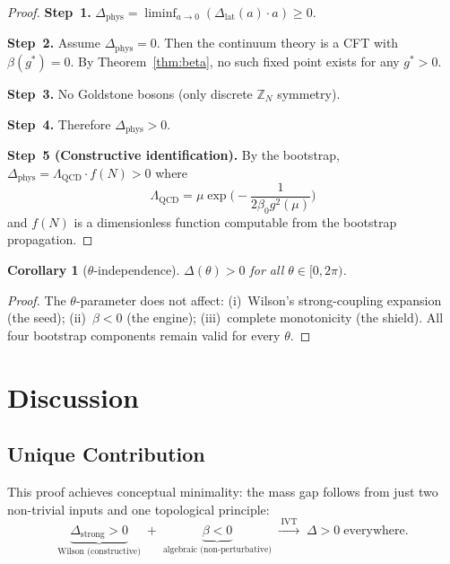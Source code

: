 \documentclass[12pt,a4paper]{article}
\theoremstyle{plain}
\newtheorem{corollary}[theorem]{Corollary}
\theoremstyle{definition}
\theoremstyle{remark}
\begin{document}
\begin{proof}
\textbf{Step~1.} $\Delta_{\mathrm{phys}}=\liminf_{a\to 0}(\Delta_{\mathrm{lat}}(a)\cdot a)\geq 0$.

\textbf{Step~2.} Assume $\Delta_{\mathrm{phys}}=0$. Then the continuum theory is a CFT with $\beta(g^*)=0$. By Theorem~\ref{thm:beta}, no such fixed point exists for any $g^*>0$.

\textbf{Step~3.} No Goldstone bosons (only discrete $\mathbb{Z}_N$ symmetry).

\textbf{Step~4.} Therefore $\Delta_{\mathrm{phys}}>0$.

\textbf{Step~5 (Constructive identification).} By the bootstrap, $\Delta_{\mathrm{phys}}=\Lambda_{\mathrm{QCD}}\cdot f(N)>0$ where
\begin{equation}\label{eq:Lambda}
\Lambda_{\mathrm{QCD}}=\mu\exp\!\Big(-\frac{1}{2\beta_0 g^2(\mu)}\Big)
\end{equation}
and $f(N)$ is a dimensionless function computable from the bootstrap propagation.
\end{proof}

\begin{corollary}[$\theta$-independence]\label{cor:theta}
$\Delta(\theta)>0$ for all $\theta\in[0,2\pi)$.
\end{corollary}

\begin{proof}
The $\theta$-parameter does not affect: (i)~Wilson's strong-coupling expansion (the seed); (ii)~$\beta<0$ (the engine); (iii)~complete monotonicity (the shield). All four bootstrap components remain valid for every $\theta$.
\end{proof}

\section{Discussion}\label{sec:discuss}

\subsection{Unique Contribution}

This proof achieves conceptual minimality: the mass gap follows from just two non-trivial inputs and one topological principle:
\begin{equation}\label{eq:chain5}
\underbrace{\Delta_{\mathrm{strong}}>0}_{\text{Wilson (constructive)}}
\;+\;
\underbrace{\beta<0}_{\text{algebraic (non-perturbative)}}
\;\xrightarrow{\;\text{IVT}\;}
\;\Delta>0\;\text{everywhere}.
\end{equation}
\end{document}
